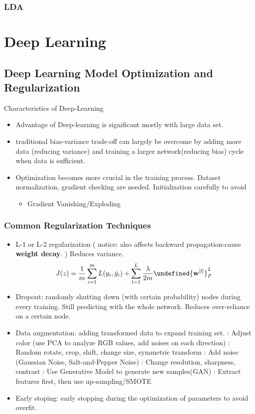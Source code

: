 \documentclass[11pt, openany]{book}              %
\let\norm\undefined %
\DeclarePairedDelimiter\norm{\lVert}{\rVert}
\begin{document}
\section{LDA}


\part{Deep Learning}

\chapter{Deep Learning Model Optimization and Regularization}

Characteristics of Deep-Learning

\begin{itemize}
    \item Advantage of Deep-learning is significant mostly with large data set.
    \item traditional bias-variance trade-off can largely be overcome by adding more data (reducing variance) and training a larger network(reducing bias) cycle when data is sufficient.
    \item Optimization becomes more crucial in the training process. Dataset normalization, gradient checking are needed. Initialization carefully to avoid 
    \begin{itemize}
    	\item Gradient Vanishing/Exploding	
    \end{itemize}
\end{itemize}

\section{Common Regularization Techniques}

\begin{itemize}
    \item L-1 or L-2 regularization ( notice: also affects backward propagation-cause 
\textbf{weight decay}. ) Reduces variance.
	$$J(z) = \frac{1}{m} \sum_{i=1}^m L(y_i,\hat{y}_i) + \sum_{l=1}^L\frac{\lambda}{2m}\norm{\mathbf{w}^{[l]}}^2_F$$
   \item Dropout: randomly shutting down (with certain probability) nodes during every training. Still predicting with the whole network. Reduces over-reliance on a certain node.
  \item Data augmentation: adding transformed data to expand training set. 
  		\subitem: Adjust color (use PCA to analyze RGB values, add noises on each direction)
  		\subitem: Random rotate, crop, shift, change size, symmetric transform
  		\subitem: Add noise (Gaussian Noise, Salt-and-Pepper Noise)
  		\subitem: Change resolution, sharpness, contrast
  		\subitem: Use Generative Model to generate new samples(GAN)
  		\subitem: Extract features first, then use up-sampling/SMOTE
 \item Early stoping: early stopping during the optimization of parameters to avoid overfit.
\end{itemize}
\end{document}
